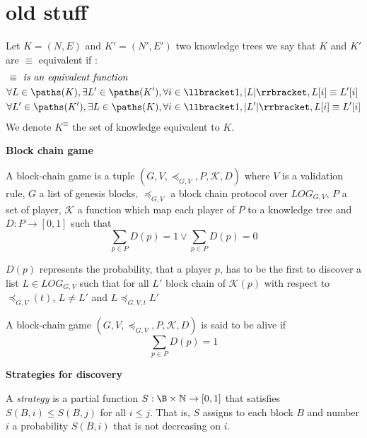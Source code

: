 \section{old stuff}

\begin{mydef}
	Let $K = (N,E)$ and $K'=(N',E')$ two knowledge trees we say that $K$ and $K'$ are $\equiv$ equivalent if :
	\begin{eqnarray*}
		& \equiv \textit{ is an equivalent function} \\
		& \forall L \in \paths(K), \exists L' \in \paths(K'), \forall i \in \llbracket 1,|L| \rrbracket, L[i] \equiv L'[i] \\
		& \forall L' \in \paths(K'), \exists L \in \paths(K), \forall i \in \llbracket 1,|L'| \rrbracket, L[i] \equiv L'[i] \\
	\end{eqnarray*}	
	We denote $K^{\equiv}$ the set of knowledge equivalent to $K$. 
\end{mydef}

\medskip
\noindent
\textbf{Block chain game}

\begin{mydef}
A block-chain game is a tuple $(G,V,\preceq_{G,V},P,\mathcal K,D)$ where $V$ is a validation rule, $G$ a list of genesis blocks, $\preceq_{G,V}$ a block chain protocol over $LOG_{G,V}$, $P$ a set of player, $\mathcal K$ a function which map each player of $P$ to a knowledge tree and $D : P \rightarrow [0, 1] $ such that $$\sum_{p\in P} D(p) = 1 \lor \sum_{p\in P} D(p) = 0$$ 
\end{mydef}
$D(p)$ represents the probability, that a player $p$, has to be the first to discover a list $L \in LOG_{G,V}$ such that for all $L'$ block chain of $\mathcal K (p)$ with respect to $\preceq_{G,V}(t)$, $L \neq L'$ and $L \preceq_{G,V,t} L'$

\begin{mydef}
	A block-chain game $(G,V,\preceq_{G,V},P,\mathcal K,D)$ is said to be alive if $$\sum_{p\in P} D(p) = 1$$
\end{mydef}

\medskip
\noindent
\textbf{Strategies for discovery}

\begin{mydef}
	A \emph{strategy} is a partial function $S: \B \times \mathbb{N} \rightarrow [0,1]$ that 
	satisfies $S(B,i) \leq S(B,j)$ for all $i \leq j$. That is, $S$ assigns 
	to each block $B$ and number $i$ a probability $S(B,i)$ that is not decreasing on $i$. 
\end{mydef}

